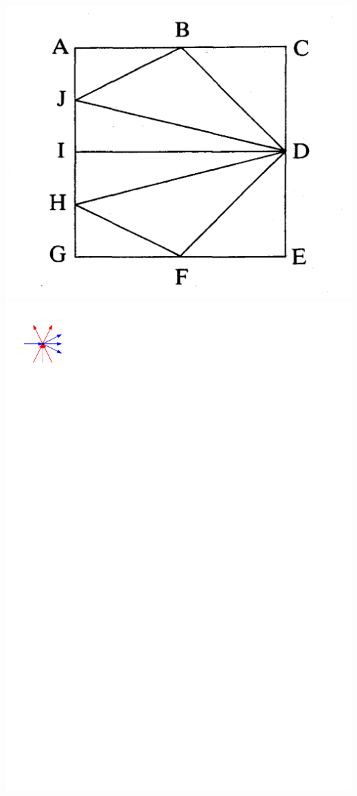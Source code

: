 \documentclass[a4paper]{article}
\begin{document}
\clearpage%
\includegraphics[scale=.15]{./introduction/img/rinsma.png}
\clearpage%
\includegraphics[width = \textwidth]{./rectangularDuals/img/interiorcondition.pdf}
\end{document}
